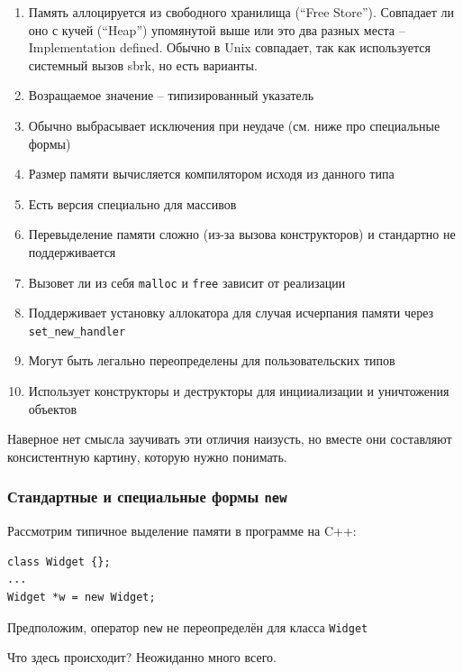 \documentclass[a4paper,12pt,oneside]{article}
\begin{document}
\begin{enumerate}
\item
Память аллоцируется из свободного хранилища (``Free Store''). Совпадает ли оно с кучей (``Heap'') упомянутой выше или это два разных места -- Implementation defined. Обычно в Unix совпадает, так как используется системный вызов sbrk, но есть варианты.
\item
Возращаемое значение -- типизированный указатель
\item
Обычно выбрасывает исключения при неудаче (см. ниже про специальные формы)
\item
Размер памяти вычисляется компилятором исходя из данного типа
\item
Есть версия специально для массивов
\item
Перевыделение памяти сложно (из-за вызова конструкторов) и стандартно не поддерживается
\item
Вызовет ли из себя \lstinline!malloc! и \lstinline!free! зависит от реализации
\item
Поддерживает установку аллокатора для случая исчерпания памяти через \lstinline!set_new_handler!
\item
Могут быть легально переопределены для пользовательских типов
\item
Использует конструкторы и деструкторы для инцииализации и уничтожения объектов
\end{enumerate}

Наверное нет смысла заучивать эти отличия наизусть, но вместе они составляют консистентную картину, которую нужно понимать.

\subsubsection{Стандартные и специальные формы \lstinline!new!}

Рассмотрим типичное выделение памяти в программе на C++:

\begin{lstlisting}
class Widget {};
...
Widget *w = new Widget;
\end{lstlisting}

Предположим, оператор \lstinline!new! не переопределён для класса \lstinline!Widget!

Что здесь происходит? Неожиданно много всего.
\end{document}
